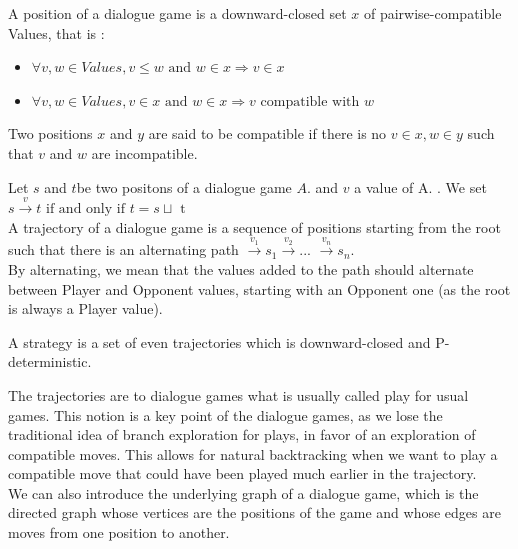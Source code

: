 \documentclass[a4paper,UKenglish]{lipics}
\begin{document}
\begin{definition}
A position of a dialogue game is a downward-closed set $x$ of pairwise-compatible Values, that is : 
\begin{itemize}
\item $\forall v,w \in Values, v\leq w \text{ and } w\in x \Rightarrow v \in x$
\item $\forall v,w \in Values,  v \in x \text{ and } w\in x \Rightarrow  v\text{ compatible with } w$\\

\end{itemize} 


Two positions $x$ and $y$ are said to be compatible if there is no $v \in x, w \in y$ such that $v$ and $w$ are incompatible.\\
\end{definition}
\begin{definition}

Let $s$ and $t$be two positons of a dialogue game $A$. and $v$ a value of A. . We set $s \xrightarrow{v} t \text{ if and only if } t = s \sqcup \text{ t} $\\

A trajectory of a dialogue game is a sequence of positions starting from the root such that there is an alternating path $ \xrightarrow{v_1} s_1 \xrightarrow{v_2} $... $\xrightarrow{v_n} s_n$.\\

By alternating, we mean that the values added to the path should alternate between Player and Opponent values, starting with an Opponent one (as the root is always a Player value).

A strategy is a set of even trajectories which is downward-closed and P-deterministic.
\end{definition}

The trajectories are to dialogue games what is usually called play for usual games. This notion is a key point of the dialogue games, as we lose the traditional idea of branch exploration for plays, in favor of an exploration of compatible moves. This allows for natural backtracking when we want to play a compatible move that could have been played much earlier in the trajectory.\\

We can also introduce the underlying graph of a dialogue game, which is the directed graph whose vertices are the positions of the game and whose edges are moves from one position to another.
\end{document}
